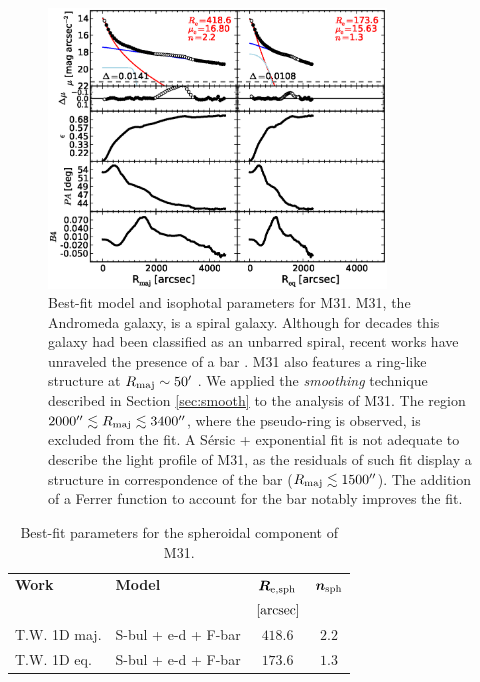 \documentclass[preprint2]{emulateapj}
\newcommand{\fitfigurewidth}{0.8\textwidth}
\begin{document}
  \begin{figure}[h]
  \begin{center}
  \includegraphics[width=\fitfigurewidth]{images/m31_1Dfit.eps}
  \caption{Best-fit model and isophotal parameters for M31.
  M31, the Andromeda galaxy, is a spiral galaxy. 
  Although for decades this galaxy had been classified as an unbarred spiral,
  recent works have unraveled the presence of a bar \citep{athanassoulabeaton2006m31,beaton2007m31,morrison2011m31}.
  M31 also features a ring-like structure at $R_{\rm maj} \sim 50'$ \citep{athanassoulabeaton2006m31}. 
  We applied the \emph{smoothing} technique described in Section \ref{sec:smooth} to the analysis of M31.
  The region $2000'' \lesssim R_{\rm maj} \lesssim 3400''$, where the pseudo-ring is observed, is excluded from the fit.
  A S\'ersic + exponential fit is not adequate to describe the light profile of M31,
  as the residuals of such fit display a structure in correspondence of the bar ($R_{\rm maj} \lesssim 1500''$).
  The addition of a Ferrer function to account for the bar notably improves the fit.
  }
  \end{center}
  \end{figure}


  \begin{table}[h]
  \small
  \caption{Best-fit parameters for the spheroidal component of M31.}
  \begin{center}
  \begin{tabular}{llcc}
  \hline
  {\bf Work} & {\bf Model}   & $\bm R_{\rm e,sph}$    & $\bm n_{\rm sph}$ \\
    &  &  $[\rm arcsec]$ & \\
  \hline
  T.W. 1D maj. & S-bul + e-d + F-bar & $418.6$  &  $2.2$ \\
  T.W. 1D eq.  & S-bul + e-d + F-bar & $173.6$  &  $1.3$ \\
  \hline
  \end{tabular}
  \end{center}
  \label{tab:m31}
  \end{table}
\end{document}
